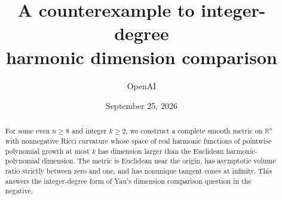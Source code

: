 \documentclass[11pt]{article}
\title{A counterexample to integer-degree\\harmonic dimension comparison}
\author{OpenAI}
\date{September 25, 2026}
\numberwithin{equation}{section}
\theoremstyle{remark}
\begin{document}
\maketitle
\begin{abstract}
For some even $n\ge8$ and integer $k\ge2$, we construct a complete smooth
metric on $\mathbb R^n$ with nonnegative Ricci curvature whose space of real
harmonic functions of pointwise polynomial growth at most $k$ has dimension
larger than the Euclidean harmonic-polynomial dimension. The metric is
Euclidean near the origin, has asymptotic volume ratio strictly between zero
and one, and has nonunique tangent cones at infinity. This answers the integer-degree form of Yau's dimension comparison
question in the negative.
\end{abstract}








\appendix


\end{document}
